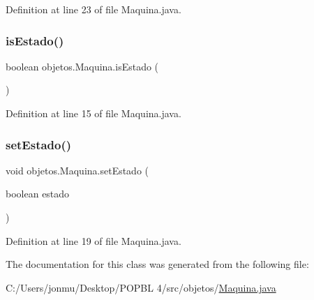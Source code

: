 Definition at line 23 of file Maquina.\+java.

\mbox{\label{classobjetos_1_1_maquina_a03b4c97926e8db81a5a28459293c16b6}} 
\subsubsection{\texorpdfstring{is\+Estado()}{isEstado()}}
{\footnotesize\ttfamily boolean objetos.\+Maquina.\+is\+Estado (\begin{DoxyParamCaption}{ }\end{DoxyParamCaption})}



Definition at line 15 of file Maquina.\+java.

\mbox{\label{classobjetos_1_1_maquina_a8a5d703c85d9a8a4a7ff352b01ff085b}} 
\subsubsection{\texorpdfstring{set\+Estado()}{setEstado()}}
{\footnotesize\ttfamily void objetos.\+Maquina.\+set\+Estado (\begin{DoxyParamCaption}\item[{boolean}]{estado }\end{DoxyParamCaption})}



Definition at line 19 of file Maquina.\+java.



The documentation for this class was generated from the following file\+:\begin{DoxyCompactItemize}
\item 
C\+:/\+Users/jonmu/\+Desktop/\+P\+O\+P\+B\+L 4/src/objetos/\mbox{\hyperlink{_maquina_8java}{Maquina.\+java}}\end{DoxyCompactItemize}
